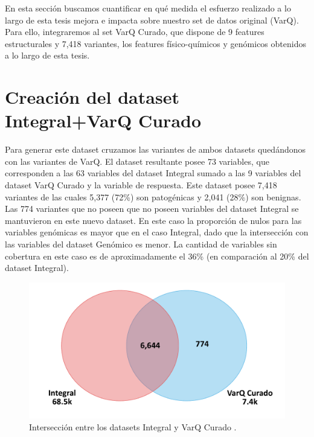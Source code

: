 
En esta sección buscamos cuantificar en qué medida el esfuerzo realizado a lo largo de esta tesis mejora e impacta sobre nuestro set de datos original (VarQ). Para ello, integraremos al set VarQ Curado, que dispone de 9 features estructurales y 7,418 variantes, los features físico-químicos y genómicos obtenidos a lo largo de esta tesis.

\section{Creación del dataset Integral+VarQ Curado}
Para generar este dataset cruzamos las variantes de ambos datasets quedándonos con las variantes de VarQ. El dataset resultante posee 73 variables, que corresponden a las 63 variables del dataset Integral sumado a las 9 variables del dataset VarQ Curado y la variable de respuesta. Este dataset posee 7,418 variantes de las cuales 5,377 (72\%) son patogénicas y 2,041 (28\%) son benignas. Las 774 variantes que no poseen que no poseen variables del dataset Integral se mantuvieron en este nuevo dataset. En este caso la proporción de nulos para las variables genómicas es mayor que en el caso Integral, dado que la intersección con las variables del dataset Genómico es menor. La cantidad de variables sin cobertura en este caso es de aproximadamente el 36\% (en comparación al 20\% del dataset Integral).

\begin{figure}[H]
    \centering
    \includegraphics[scale=0.4]{documents/latex/figures/3/integral_varq/interseccion_varq_integral.pdf}
    \caption{Intersección entre los datasets Integral y VarQ Curado .}
    \label{fig:interseccion_varq_integral}
\end{figure}

